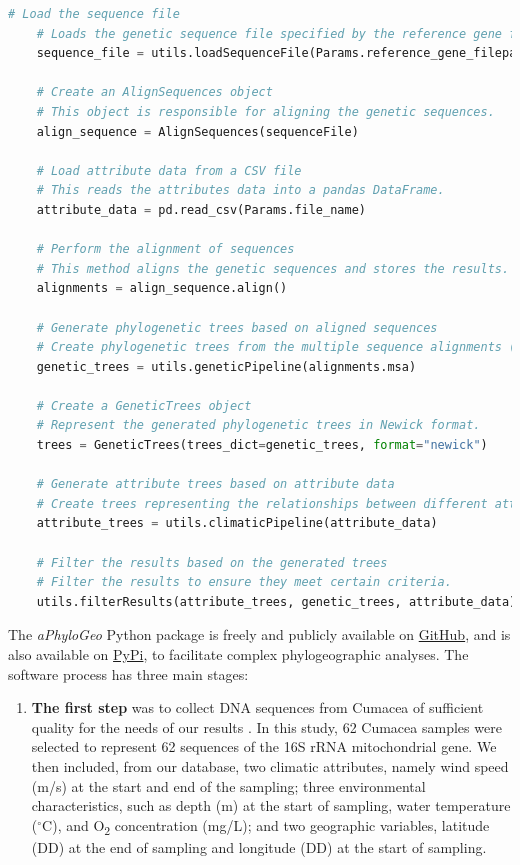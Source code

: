 {\begin{lstlisting}[label=lst:main,language=Python,caption=Main script for tutorial using the aPhyloGeo package.]
    # Load the sequence file
    # Loads the genetic sequence file specified by the reference gene filepath.
    sequence_file = utils.loadSequenceFile(Params.reference_gene_filepath)

    # Create an AlignSequences object
    # This object is responsible for aligning the genetic sequences.
    align_sequence = AlignSequences(sequenceFile)

    # Load attribute data from a CSV file
    # This reads the attributes data into a pandas DataFrame.
    attribute_data = pd.read_csv(Params.file_name)

    # Perform the alignment of sequences
    # This method aligns the genetic sequences and stores the results.
    alignments = align_sequence.align()

    # Generate phylogenetic trees based on aligned sequences
    # Create phylogenetic trees from the multiple sequence alignments (MSA).
    genetic_trees = utils.geneticPipeline(alignments.msa)
    
    # Create a GeneticTrees object
    # Represent the generated phylogenetic trees in Newick format.
    trees = GeneticTrees(trees_dict=genetic_trees, format="newick")
   
    # Generate attribute trees based on attribute data
    # Create trees representing the relationships between different attributes.
    attribute_trees = utils.climaticPipeline(attribute_data)
    
    # Filter the results based on the generated trees
    # Filter the results to ensure they meet certain criteria.
    utils.filterResults(attribute_trees, genetic_trees, attribute_data)
\end{lstlisting}

The \textit{aPhyloGeo} Python package is freely and publicly available on \href{https://github.com/tahiri-lab/aPhyloGeo}{GitHub}, and is also available on \href{https://pypi.org/project/aphylogeo/}{PyPi}, to facilitate complex phylogeographic analyses. The software process has three main stages:

\begin{enumerate}
\item \textbf{The first step} was to collect DNA sequences from Cumacea of sufficient quality for the needs of our results \citep{koshkarov_phylogeography_2022}. In this study, 62 Cumacea samples were selected to represent 62 sequences of the 16S rRNA mitochondrial gene. We then included, from our database, two climatic attributes, namely wind speed (m/s) at the start and end of the sampling; three environmental characteristics, such as depth (m) at the start of sampling, water temperature ($^\circ$C), and O\textsubscript{2} concentration (mg/L); and two geographic variables, latitude (DD) at the end of sampling and longitude (DD) at the start of sampling.


\end{enumerate}}
